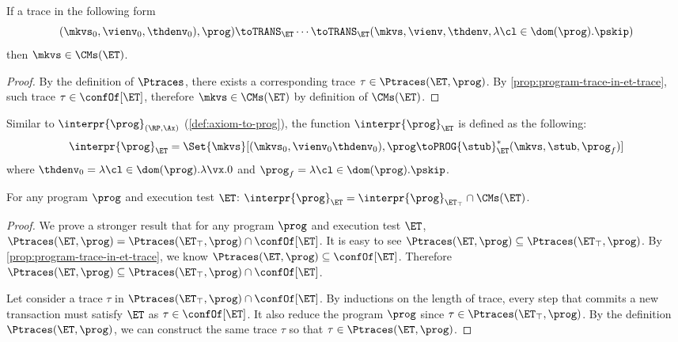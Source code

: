 \begin{corollary}
If a trace in the following form
\[
    (\mkvs_{0}, \vienv_{0}, \thdenv_{0}), \prog) \toTRANS_{\ET} \cdots \toTRANS_{\ET} 
    (\mkvs, \vienv, \thdenv, \lambda \cl \in \dom(\prog). \pskip)
\]
then $\mkvs \in \CMs(\ET)$.
\end{corollary}
\begin{proof}
    By the definition of \( \Ptraces \), 
    there exists a corresponding trace \( \tau \in \Ptraces(\ET, \prog) \).
    By \cref{prop:program-trace-in-et-trace}, such trace \( \tau \in \confOf[\ET] \),
    therefore \( \mkvs \in \CMs(\ET)\) by definition of \( \CMs(\ET) \).
\end{proof}

Similar to \( \interpr{\prog}_{(\RP,\Ax)} \) (\cref{def:axiom-to-prog}), the function \( \interpr{\prog}_{\ET} \) is defined as the following:
\[
    \interpr{\prog}_{\ET} = \Set{ \mkvs }[ (\mkvs_{0}, \vienv_0 \thdenv_{0} ), \prog \toPROG{\stub}_{\ET}^{\ast} (\mkvs, \stub, \prog_{f}) ]
\]
where $\thdenv_{0} = \lambda \cl \in \dom(\prog).\lambda \vx.0$ and $\prog_{f} = \lambda \cl \in \dom(\prog).\pskip$.

\begin{proposition}
    \label{thm:consistency-intersect-permissive}
    For any program $\prog$ and execution test $\ET$:
    \( \interpr{\prog}_{\ET} = \interpr{\prog}_{\ET_\top}  \cap \CMs(\ET) \).
\end{proposition}
\begin{proof}
    We prove a stronger result that for any program $\prog$ and execution test $\ET$, $\Ptraces(\ET, \prog) = \Ptraces(\ET_{\top}, \prog) \cap \confOf[\ET]$.
    It is easy to see \(\Ptraces(\ET, \prog) \subseteq \Ptraces(\ET_\top, \prog) \).
    By \cref{prop:program-trace-in-et-trace}, we know \( \Ptraces(\ET, \prog) \subseteq \confOf[\ET]\).
    Therefore \(  \Ptraces(\ET, \prog) \subseteq \Ptraces(\ET_\top, \prog) \cap \confOf[\ET] \).

    Let consider a trace \( \tau \) in \( \Ptraces(\ET_\top, \prog) \cap \confOf[\ET] \).
    By inductions on the length of trace, 
    every step that commits a new transaction  must satisfy \( \ET \) as \( \tau \in \confOf[\ET] \).
    It also reduce the program \( \prog \) since \( \tau \in \Ptraces(\ET_\top, \prog) \).
    By the definition \( \Ptraces(\ET, \prog) \), we can construct the same trace \( \tau \) so that \( \tau \in \Ptraces(\ET, \prog) \).
\end{proof}
